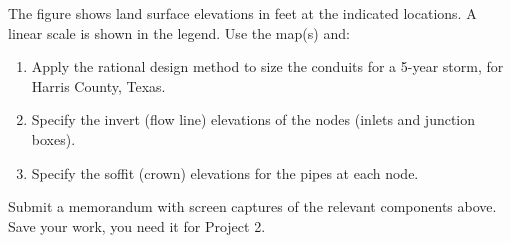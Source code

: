 \documentclass[12pt]{article}
\begin{document}
The figure shows land surface elevations in feet at the indicated locations.  
A linear scale is shown in the legend.  
Use the map(s) and:

\begin{enumerate}
\item Apply the rational design method to size the conduits for a 5-year storm, for Harris County, Texas.
\item Specify the invert (flow line) elevations of the nodes (inlets and junction boxes).
\item Specify the soffit (crown) elevations for the pipes at each node.
\end{enumerate}

Submit a memorandum with screen captures of the relevant components above.  Save your work, you need it for Project 2.













 
\end{document}
